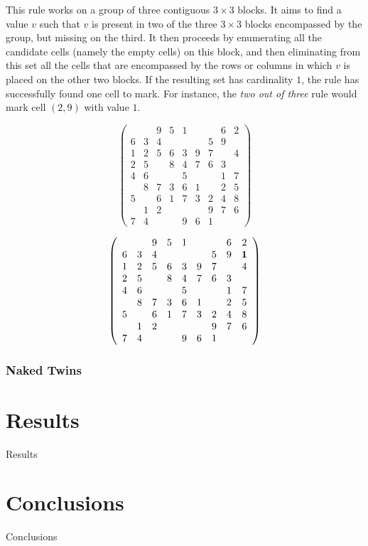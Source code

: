 \documentclass{article}
\begin{document}
This rule works on a group of three contiguous $3 \times 3$ blocks. It aims to find a value $v$ such that $v$ is present in two of the three $3 \times 3$ blocks encompassed by the group, but missing on the third. It then proceeds by enumerating all the candidate cells (namely the empty cells) on this block, and then eliminating from this set all the cells that are encompassed by the rows or columns in which $v$ is placed on the other two blocks. If the resulting set has cardinality $1$, the rule has successfully found one cell to mark. For instance, the {\em two out of three} rule would mark cell $(2,9)$ with value $1$.

\[ \left( \begin{array}{ccccccccc}
  &   & 9 & 5 & 1 &   &   & 6 & 2 \\
6 & 3 & 4 &   &   &   & 5 & 9 &   \\
1 & 2 & 5 & 6 & 3 & 9 & 7 &   & 4 \\
2 & 5 &   & 8 & 4 & 7 & 6 & 3 &   \\
4 & 6 &   &   & 5 &   &   & 1 & 7 \\
  & 8 & 7 & 3 & 6 & 1 &   & 2 & 5 \\
5 &   & 6 & 1 & 7 & 3 & 2 & 4 & 8 \\
  & 1 & 2 &   &   &   & 9 & 7 & 6 \\
7 & 4 &   &   & 9 & 6 & 1 &   &   \end{array}  \right)\]

\[ \left( \begin{array}{ccccccccc}
  &   & 9 & 5 & 1 &   &   & 6 & 2 \\
6 & 3 & 4 &   &   &   & 5 & 9 & {\bf 1} \\
1 & 2 & 5 & 6 & 3 & 9 & 7 &   & 4 \\
2 & 5 &   & 8 & 4 & 7 & 6 & 3 &   \\
4 & 6 &   &   & 5 &   &   & 1 & 7 \\
  & 8 & 7 & 3 & 6 & 1 &   & 2 & 5 \\
5 &   & 6 & 1 & 7 & 3 & 2 & 4 & 8 \\
  & 1 & 2 &   &   &   & 9 & 7 & 6 \\
7 & 4 &   &   & 9 & 6 & 1 &   &   \end{array}  \right)\]

\subsubsection{Naked Twins}

\section{Results}

Results

\section{Conclusions}

Conclusions



\end{document}
